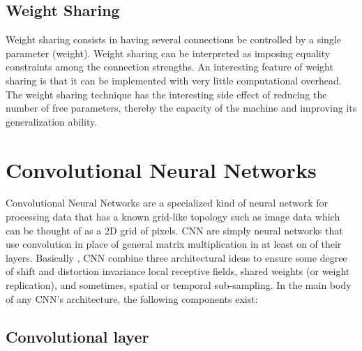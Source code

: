 \subsection{Weight Sharing}

Weight sharing consists in having several connections be controlled by a single parameter (weight). Weight sharing can be interpreted as imposing equality constraints among the connection strengths. An interesting feature of weight sharing is that it can be implemented with very little computational overhead\cite{lecun1989generalization}. The weight sharing technique has the interesting side effect of reducing the number of free parameters, thereby the capacity of the machine and improving its generalization ability\cite{lecun2010convolutional}.

\section{Convolutional Neural Networks}

Convolutional Neural Networks are a specialized kind of neural network for processing data that has a known grid-like topology such as image data which can be thought of as a 2D grid of pixels. CNN are simply neural networks that use convolution in place of general matrix multiplication in at least on of their layers\cite{Goodfellow-et-al-2016-Book}. 
Basically , CNN combine three architectural ideas to ensure some degree of shift and distortion invariance local receptive fields, shared weights (or weight replication), and sometimes, spatial or temporal sub-sampling\cite{lecun2010convolutional}. 
In the main body of any CNN's architecture, the following components exist:

\subsection{Convolutional layer} 

